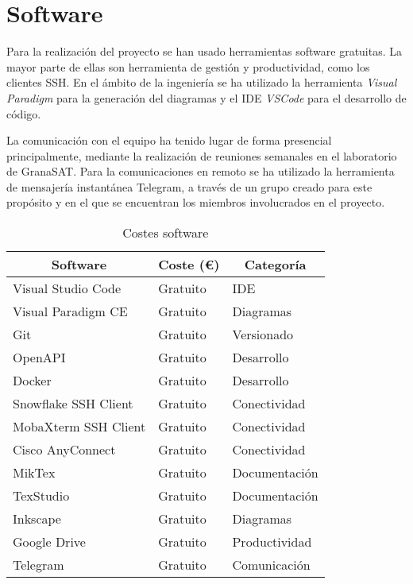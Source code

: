 \section{Software}

Para la realización del proyecto se han usado herramientas software gratuitas. La mayor parte de ellas son herramienta de gestión y productividad, como los clientes SSH. En el ámbito de la ingeniería se ha utilizado la herramienta \textit{Visual Paradigm} para la generación del diagramas y el IDE \textit{VSCode} para el desarrollo de código.

La comunicación con el equipo ha tenido lugar de forma presencial principalmente, mediante la realización de reuniones semanales en el laboratorio de GranaSAT. Para la comunicaciones en remoto se ha utilizado la herramienta de mensajería instantánea Telegram, a través de un grupo creado para este propósito y en el que se encuentran los miembros involucrados en el proyecto.

\begin{table}[h]
\centering
\begin{tabular}{lll}
\hline
\multicolumn{1}{c}{\textbf{Software}} & \multicolumn{1}{c}{\textbf{Coste (€)}} & \multicolumn{1}{c}{\textbf{Categoría}} \\ \hline
Visual Studio Code                    & Gratuito  &  IDE            \\
Visual Paradigm CE                    & Gratuito  &  Diagramas      \\
Git                                   & Gratuito  &  Versionado     \\
OpenAPI                               & Gratuito  &  Desarrollo     \\
Docker                                & Gratuito  &  Desarrollo     \\
Snowflake SSH Client                  & Gratuito  &  Conectividad   \\
MobaXterm SSH Client                  & Gratuito  &  Conectividad   \\
Cisco AnyConnect                      & Gratuito  &  Conectividad   \\
MikTex                                & Gratuito  &  Documentación  \\
TexStudio                             & Gratuito  &  Documentación  \\
Inkscape                              & Gratuito  &  Diagramas      \\
Google Drive                          & Gratuito  &  Productividad  \\
Telegram                              & Gratuito  &  Comunicación   \\
\hline
\end{tabular}%
\caption{Costes software}
\label{tab:presupuesto-software}
\end{table}

